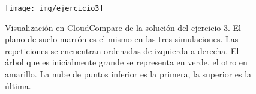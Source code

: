 \documentclass[]{article}
\begin{document}
	\begin{figure}[htb]
		\centering
		\texttt{[image: img/ejercicio3]}
		\caption{Visualización en CloudCompare de la solución del ejercicio 3. El plano de suelo marrón es el mismo en las tres simulaciones. Las repeticiones se encuentran ordenadas de izquierda a derecha. El árbol que es inicialmente grande se representa en verde, el otro en amarillo. La nube de puntos inferior es la primera, la superior es la última.}
		\label{fig:ejercicio3}
	\end{figure}

	
\end{document}
